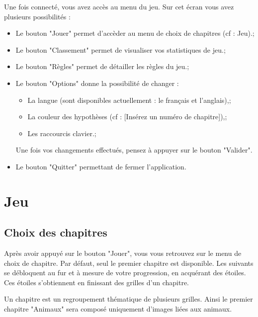 \documentclass[a4paper, 12pt]{report}
\begin{document}
	    Une fois connecté, vous avez accès au menu du jeu. Sur cet écran vous avez plusieurs possibilités :
	    \begin{itemize}
            \item Le bouton "Jouer" permet d'accèder au menu de choix de chapitres (cf : Jeu).;
            \item Le bouton "Classement" permet de visualiser vos statistiques de jeu.;
            \item Le bouton "Règles" permet de détailler les règles du jeu.;
            \item Le bouton "Options" donne la possibilité de changer :
            \begin{itemize}
                \item La langue (sont disponibles actuellement : le français et l'anglais),;
                \item La couleur des hypothèses (cf : [Insérez un numéro de chapitre]),;
                \item Les raccourcis clavier.;
            \end{itemize}
            Une fois vos changements effectués, pensez à appuyer sur le bouton "Valider".
            \item Le bouton "Quitter" permettant de fermer l'application.
        \end{itemize}



	\section{Jeu}

        \subsection{Choix des chapitres}
        
            Après avoir appuyé sur le bouton "Jouer", vous vous retrouvez sur le menu de choix de chapitre.
            Par défaut, seul le premier chapitre est disponible. Les suivants se débloquent au fur et à mesure de votre progression, en acquérant des étoiles. 
            Ces étoiles s'obtiennent en finissant des grilles d'un chapitre.
            
            Un chapitre est un regroupement thématique de plusieurs grilles. Ainsi le premier chapitre "Animaux" sera composé uniquement d'images liées aux animaux. 
            
\end{document}
